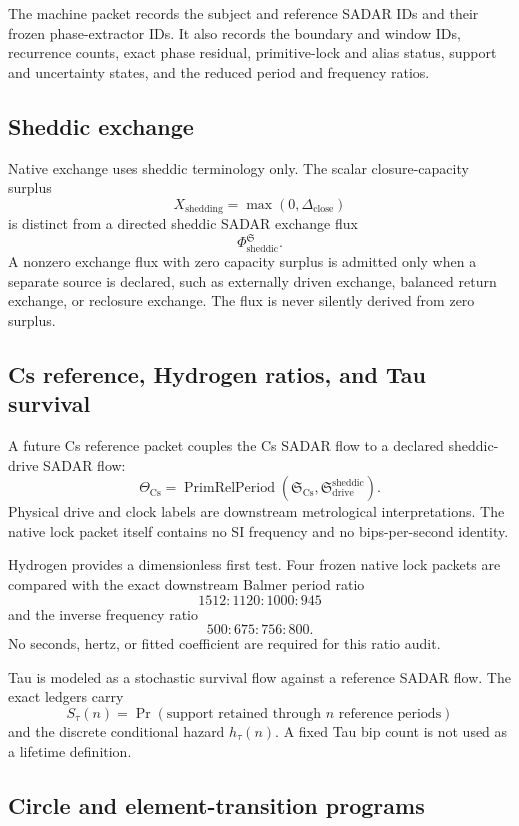 The machine packet records the subject and reference SADAR IDs and their
frozen phase-extractor IDs.  It also records the boundary and window IDs,
recurrence counts, exact phase residual, primitive-lock and alias status,
support and uncertainty states, and the reduced period and frequency ratios.

\subsection{Sheddic exchange}

Native exchange uses sheddic terminology only.  The scalar closure-capacity
surplus
\[
X_{\mathrm{shedding}}
=
\max(0,\Delta_{\mathrm{close}})
\]
is distinct from a directed sheddic SADAR exchange flux
\[
\Phi_{\mathrm{sheddic}}^{\mathfrak S}.
\]
A nonzero exchange flux with zero capacity surplus is admitted only when a
separate source is declared, such as externally driven exchange, balanced
return exchange, or reclosure exchange.  The flux is never silently derived
from zero surplus.

\subsection{Cs reference, Hydrogen ratios, and Tau survival}

A future Cs reference packet couples the Cs SADAR flow to a declared
sheddic-drive SADAR flow:
\[
\Theta_{\mathrm{Cs}}
=
\operatorname{PrimRelPeriod}
\left(
\mathfrak S_{\mathrm{Cs}},
\mathfrak S_{\mathrm{drive}}^{\mathrm{sheddic}}
\right).
\]
Physical drive and clock labels are downstream metrological interpretations.
The native lock packet itself contains no SI frequency and no bips-per-second
identity.

Hydrogen provides a dimensionless first test.  Four frozen native lock packets
are compared with the exact downstream Balmer period ratio
\[
1512:1120:1000:945
\]
and the inverse frequency ratio
\[
500:675:756:800.
\]
No seconds, hertz, or fitted coefficient are required for this ratio audit.

Tau is modeled as a stochastic survival flow against a reference SADAR flow.
The exact ledgers carry
\[
S_\tau(n)
=
\Pr(\text{support retained through }n\text{ reference periods})
\]
and the discrete conditional hazard \(h_\tau(n)\).  A fixed Tau bip count is
not used as a lifetime definition.

\subsection{Circle and element-transition programs}

